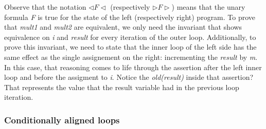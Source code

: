 Observe that the notation $\lhd F \lhd$ (respectively $\rhd F \rhd$) means that the unary formula \emph{F} is true for the state of the left (respectively right) program.
To prove that \emph{mult1} and \emph{mult2} are equivalent, we only need the invariant that shows equivalence on \emph{i} and \emph{result} for every iteration of the outer loop.
Additionally, to prove this invariant, we need to state that the inner loop of the left side has the same effect as the single assignement on the right: incrementing the \emph{result} by \emph{m}.
In this case, that reasoning comes to life through the assertion after the left inner loop and before the assigment to \emph{i}.
Notice the \emph{old(result)} inside that assertion? 
That represents the value that the result variable had in the previous loop iteration.


\FloatBarrier
\subsubsection{Conditionally aligned loops}
\label{subsubsec:cond_align_loops_example}

